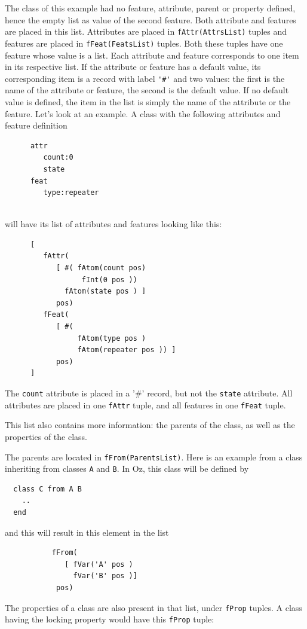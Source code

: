 \documentclass[a4paper]{memoir}
\begin{document}
The class of this example had no feature, attribute, parent or property defined, hence the empty
list as value of the second feature.
Both attribute and features are placed in this list. Attributes are placed in
\lstinline!fAttr(AttrsList)! tuples and features are placed in
\lstinline!fFeat(FeatsList)! tuples. Both these tuples have one feature whose
value is a list. Each attribute and feature corresponds to one item in its
respective list. If the attribute or feature has a default value, its
corresponding item is a record with label \lstinline!'#'! and two values: the
first is the name of the attribute or feature, the second is the default value.
If no default value is defined, the item in the list is simply the name of the
attribute or the feature.
Let's look at an example. A class with the following attributes and feature
definition
\begin{lstlisting}
      attr
         count:0
         state
      feat
         type:repeater
  
\end{lstlisting}
will have its list of attributes and features looking like this:
\begin{lstlisting}
      [
         fAttr(
            [ #( fAtom(count pos)
                  fInt(0 pos ))
              fAtom(state pos ) ]
            pos)
         fFeat(
            [ #(
                 fAtom(type pos )
                 fAtom(repeater pos )) ]
            pos)
      ]
\end{lstlisting}
The \lstinline!count! attribute is placed in a '\#' record, but not
the \lstinline!state! attribute.
All attributes are placed in one \lstinline!fAttr!
tuple, and all features in one \lstinline!fFeat! tuple.

This list also contains more information: the parents of the class, as well as
the properties of the class. 

The parents are located in \lstinline!fFrom(ParentsList)!. 
Here is an example from a class inheriting from classes \lstinline!A! and
\lstinline!B!. In Oz, this class will be defined by
\begin{lstlisting}
  class C from A B
    ..
  end
\end{lstlisting}
and this will result in this element in the list
\begin{lstlisting}
           fFrom(
              [ fVar('A' pos )
                fVar('B' pos )]
            pos)
\end{lstlisting}

The properties of a class are also present in that list, under \lstinline!fProp!
tuples. A class having the locking property would have this \lstinline!fProp! tuple:
\end{document}
